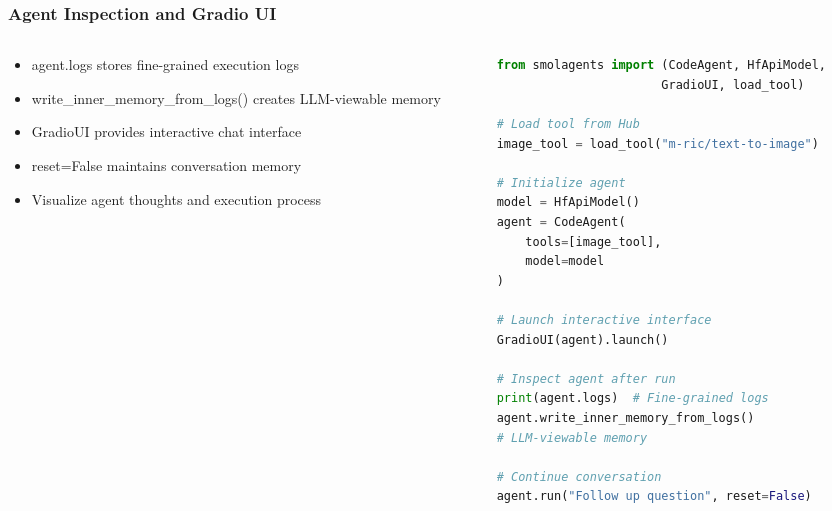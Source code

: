 \begin{frame}[fragile]\frametitle{Agent Inspection and Gradio UI}
\begin{columns}
\begin{column}{0.5\textwidth}
      \begin{itemize}
	\item agent.logs stores fine-grained execution logs
	\item write\_inner\_memory\_from\_logs() creates LLM-viewable memory
	\item GradioUI provides interactive chat interface
	\item reset=False maintains conversation memory
	\item Visualize agent thoughts and execution process
	  \end{itemize}
\end{column}
\begin{column}{0.5\textwidth}
\begin{lstlisting}[language=Python, basicstyle=\tiny]
from smolagents import (CodeAgent, HfApiModel, 
                       GradioUI, load_tool)

# Load tool from Hub
image_tool = load_tool("m-ric/text-to-image")

# Initialize agent
model = HfApiModel()
agent = CodeAgent(
    tools=[image_tool], 
    model=model
)

# Launch interactive interface
GradioUI(agent).launch()

# Inspect agent after run
print(agent.logs)  # Fine-grained logs
agent.write_inner_memory_from_logs()  
# LLM-viewable memory

# Continue conversation
agent.run("Follow up question", reset=False)
\end{lstlisting}
\end{column}
\end{columns}
\end{frame}